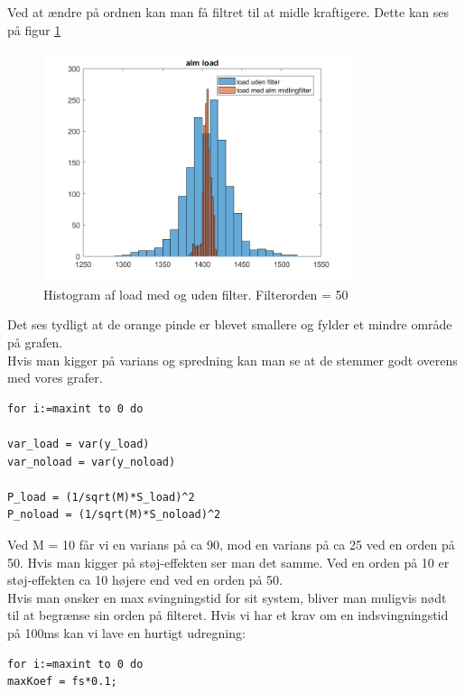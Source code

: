 \documentclass[12pt]{article}
\begin{document}
Ved at ændre på ordnen kan man få filtret til at midle kraftigere. Dette kan ses på figur \ref{fig:histogram3}

\begin{figure}[H]
	\centering
	\includegraphics[width=90mm]{Img/Histogram_load_50.png}
	\caption{Histogram af load med og uden filter. Filterorden = 50}
	\label{fig:histogram3}
\end{figure}

Det ses tydligt at de orange pinde er blevet smallere og fylder et mindre område på grafen.\\
Hvis man kigger på varians og spredning kan man se at de stemmer godt overens med vores grafer. \\
\newpage

\begin{lstlisting}[frame=single]  % Start your code-block
for i:=maxint to 0 do

var_load = var(y_load)
var_noload = var(y_noload)

P_load = (1/sqrt(M)*S_load)^2
P_noload = (1/sqrt(M)*S_noload)^2
\end{lstlisting}

Ved M = 10 får vi en varians på ca 90, mod en varians på ca 25 ved en orden på 50. Hvis man kigger på støj-effekten ser man det samme. Ved en orden på 10 er støj-effekten ca 10 højere end ved en orden på 50.\\

Hvis man ønsker en max svingningstid for sit system, bliver man muligvis nødt til at begrænse sin orden på filteret. Hvis vi har et krav om en indsvingningstid på 100ms kan vi lave en hurtigt udregning:

\begin{lstlisting}[frame=single]  % Start your code-block
for i:=maxint to 0 do
maxKoef = fs*0.1;
\end{lstlisting}
\end{document}
